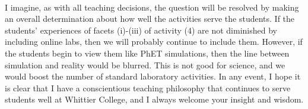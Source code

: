\documentclass[../../../main.tex]{subfiles}
\begin{document}
\\
\vspace{0.25cm}
I imagine, as with all teaching decisions, the question will be resolved by making an overall determination about how well the activities serve the students.  If the students' experiences of facets (i)-(iii) of activity (4) are not diminished by including online labs, then we will probably continue to include them.  However, if the students begin to view them like PhET simulations, then the line between simulation and reality would be blurred.  This is not good for science, and we would boost the number of standard laboratory activities.  In any event, I hope it is clear that I have a conscientious teaching philosophy that continues to serve students well at Whittier College, and I always welcome your insight and wisdom.
\end{document}
